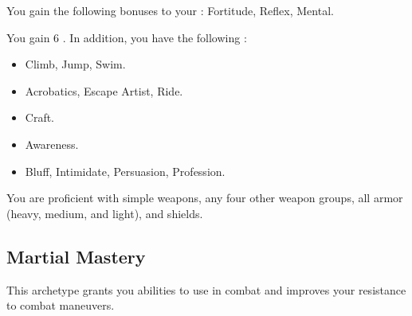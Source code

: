         You gain the following bonuses to your :  Fortitude,  Reflex,  Mental.

        You gain 6 .
        In addition, you have the following :
        \begin{itemize}
            \item {} Climb, Jump, Swim.
            \item {} Acrobatics, Escape Artist, Ride.
            \item {} Craft.
            \item {} Awareness.
            \item {} Bluff, Intimidate, Persuasion, Profession.
        \end{itemize}

        You are proficient with simple weapons, any four other weapon groups, all armor (heavy, medium, and light), and shields.

    \subsection{Martial Mastery}
        This archetype grants you abilities to use in combat and improves your resistance to combat maneuvers.

